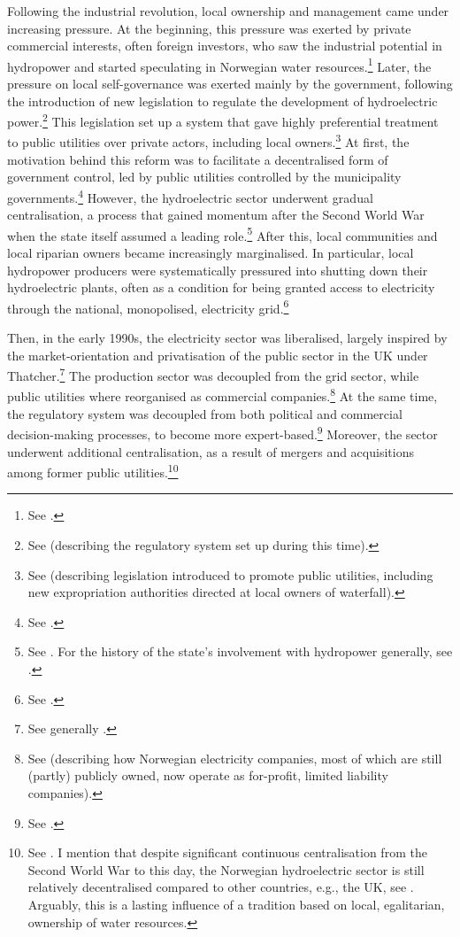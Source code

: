 Following the industrial revolution, local ownership and management came under increasing pressure. At the beginning, this pressure was exerted by private commercial interests, often foreign investors, who saw the industrial potential in hydropower and started speculating in Norwegian water resources.\footnote{See \cite[30-31]{nou04}.} Later, the pressure on local self-governance was exerted mainly by the government, following the introduction of new legislation to regulate the development of hydroelectric power.\footnote{See \cite[41-57]{thue96} (describing the  regulatory system set up during this time).} This legislation set up a system that gave highly preferential treatment to public utilities over private actors, including local owners.\footnote{See \cite[46]{thue96} (describing legislation introduced to promote public utilities, including new expropriation authorities directed at local owners of waterfall).} At first, the motivation behind this reform was to facilitate a decentralised form of government control, led by public utilities controlled by the municipality governments.\footnote{See \cite[44-47]{thue96}.} However, the hydroelectric sector underwent gradual centralisation, a process that gained momentum after the Second World War when the state itself assumed a leading role.\footnote{See \cite[59-85]{thue96}. For the history of the state's involvement with hydropower generally, see \cite{thue06, skjold06,thue06b}.} After this, local communities and local riparian owners became increasingly marginalised. In particular, local hydropower producers were systematically pressured into shutting down their hydroelectric plants, often as a condition for being granted access to electricity through the national, monopolised, electricity grid.\footnote{See \cite[p.111]{hindrum94}.}

Then, in the early 1990s, the electricity sector was liberalised, largely inspired by the market-orientation and privatisation of the public sector in the UK under Thatcher.\footnote{See generally \cite{midttun98}.} The production sector was decoupled from the grid sector, while public utilities where reorganised as commercial companies.\footnote{See \cite[86]{efta07} (describing how Norwegian electricity companies, most of which are still (partly) publicly owned, now operate as for-profit, limited liability companies).} At the same time, the regulatory system was decoupled from both political and commercial decision-making processes, to become more expert-based.\footnote{See \cite[26-27]{brekke12}.} Moreover, the sector underwent additional centralisation, as a result of mergers and acquisitions among former public utilities.\footnote{See \cite[583]{bibow03}. I mention that despite significant continuous centralisation from the Second World War to this day, the Norwegian hydroelectric sector is still relatively decentralised compared to other countries, e.g., the UK, see \cite[181]{midttun98}. Arguably, this is a lasting influence of a tradition based on local, egalitarian, ownership of water resources.}

